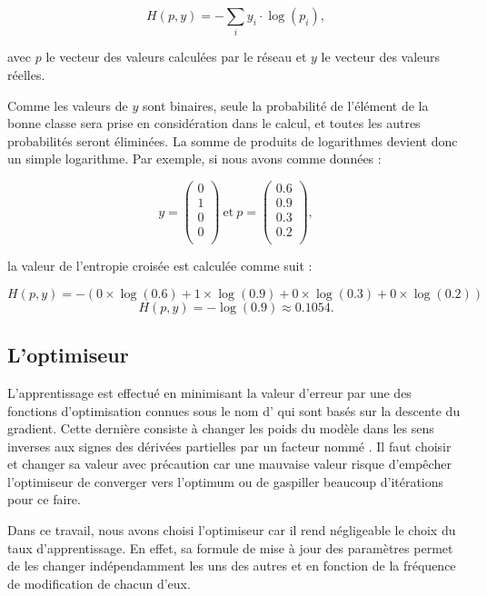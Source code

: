 $$
H(p, y) = -\sum_i y_i \cdot \log(p_i),
$$

avec $p$ le vecteur des valeurs calculées par le réseau et $y$ le vecteur des valeurs réelles.

Comme les valeurs de $y$ sont binaires, seule la probabilité de l'élément de
la bonne classe sera prise en considération dans le calcul, et toutes les autres
probabilités seront éliminées. La somme de produits de logarithmes devient
donc un simple logarithme.
Par exemple, si nous avons comme données :

$$
y =
\begin{pmatrix}
  0\\
  1\\
  0\\
  0\\
\end{pmatrix}
~
\mathrm{et}
~
p =
\begin{pmatrix}
  0.6\\
  0.9\\
  0.3\\
  0.2\\
\end{pmatrix},
$$

la valeur de l'entropie croisée est calculée comme suit :

$$
H(p, y) = -(0 \times \log(0.6) + 1 \times \log(0.9) + 0 \times \log(0.3) + 0 \times \log(0.2))
$$
$$
H(p, y) = -\log(0.9) \approx 0.1054.
$$

\subsection{L'optimiseur}

L’apprentissage est effectué en minimisant la valeur d'erreur par une des fonctions
d'optimisation connues sous le nom d' qui sont basés sur la descente
du gradient. Cette dernière consiste à changer les poids du modèle dans les sens inverses
aux signes des dérivées partielles par un facteur nommé .
Il faut choisir et changer sa valeur avec précaution car une mauvaise valeur
risque d'empêcher l'optimiseur de converger vers l'optimum ou de gaspiller beaucoup
d'itérations pour ce faire.\cite{DBLP:journals/corr/Ruder16}

Dans ce travail, nous avons choisi l'optimiseur  \cite{DBLP:journals/corr/abs-1212-5701}
car il rend négligeable le choix du taux d'apprentissage. En effet, sa
formule de mise à jour des paramètres permet de les changer indépendamment
les uns des autres et en fonction de la fréquence de modification de chacun d'eux.\cite{DBLP:journals/corr/Ruder16}

